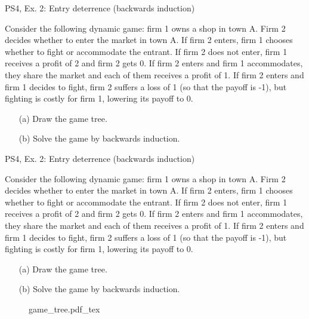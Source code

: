 \begin{frame}{PS4, Ex. 2: Entry deterrence (backwards induction)}
  \begin{multicols}{2}
    Consider the following dynamic game: firm 1 owns a shop in town A. Firm 2 decides whether to enter the market in town A. If firm 2 enters, firm 1 chooses whether to fight or accommodate the entrant. If firm 2 does not enter, firm 1 receives a profit of 2 and firm 2 gets 0. If firm 2 enters and firm 1 accommodates, they share the market and each of them receives a profit of 1. If firm 2 enters and firm 1 decides to fight, firm 2 suffers a loss of 1 (so that the payoff is -1), but fighting is costly for firm 1, lowering its payoff to 0.
    \begin{itemize}
      \item[(a)] Draw the game tree.
      \item[(b)] Solve the game by backwards induction.
    \end{itemize}
  \vfill\null \columnbreak
  \vfill\null
  \end{multicols}
\end{frame}
\begin{frame}{PS4, Ex. 2: Entry deterrence (backwards induction)}
  \begin{multicols}{2}
    Consider the following dynamic game: firm 1 owns a shop in town A. Firm 2 decides whether to enter the market in town A. If firm 2 enters, firm 1 chooses whether to fight or accommodate the entrant. If firm 2 does not enter, firm 1 receives a profit of 2 and firm 2 gets 0. If firm 2 enters and firm 1 accommodates, they share the market and each of them receives a profit of 1. If firm 2 enters and firm 1 decides to fight, firm 2 suffers a loss of 1 (so that the payoff is -1), but fighting is costly for firm 1, lowering its payoff to 0.
    \begin{itemize}
      \item[(a)] Draw the game tree.
      \item[(b)] Solve the game by backwards induction.
    \end{itemize}
  \vfill\null \columnbreak
    \begin{figure}[!h]
      \begin{center}
      \def\svgwidth{1.0\columnwidth}
      {game_tree.pdf_tex}
      \end{center}
    \end{figure}
  \vfill\null
  \end{multicols}
\end{frame}
